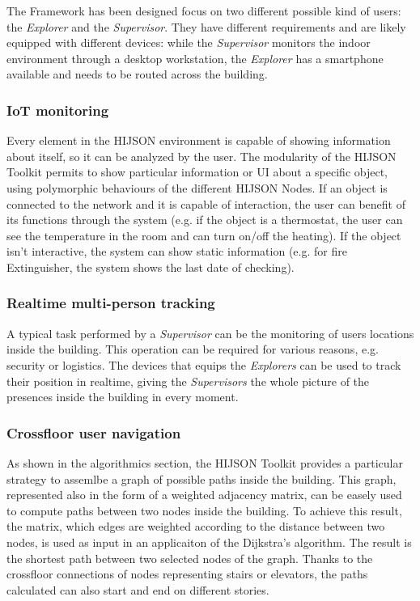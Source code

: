 \documentclass{sig-alternate}
\begin{document}
The Framework has been designed focus on two different possible kind of
users: the \emph{Explorer} and the \emph{Supervisor}. They have
different requirements and are likely equipped with different devices:
while the \emph{Supervisor} monitors the indoor environment through a
desktop workstation, the \emph{Explorer} has a smartphone available and
needs to be routed across the building.

\subsubsection{IoT monitoring}\label{iot-monitoring}

Every element in the HIJSON environment is capable of showing information
about itself, so it can be analyzed by the user. The modularity of the HIJSON
Toolkit permits to show particular information or UI about a specific object,
using polymorphic behaviours of the different HIJSON Nodes. If an object is
connected to the network and it is capable of interaction, the user can
benefit of its functions through the system (e.g. if the object is a
thermostat, the user can see the temperature in the room and can turn on/off
the heating). If the object isn't interactive, the system can show static
information (e.g. for fire Extinguisher, the system shows the last date of
checking).

\subsubsection{Realtime multi-person tracking}\label{realtime-multi-person-tracking}

A typical task performed by a \emph{Supervisor} can be the monitoring of users
locations inside the building. This operation can be required for various
reasons, e.g. security or logistics. The devices that equips the
\emph{Explorers} can be used to track their position in realtime, giving the
\emph{Supervisors} the whole picture of the presences inside the building in
every moment.

\subsubsection{Crossfloor user navigation}\label{crossfloor-user-navigation}

As shown in the algorithmics section, the HIJSON Toolkit provides a particular
strategy to assemlbe a graph of possible paths inside the building. This
graph, represented also in the form of a weighted adjacency matrix, can be
easely used to compute paths between two nodes inside the building. To
achieve this result, the matrix, which edges are weighted according to the
distance between two nodes, is used as input in an applicaiton of the
Dijkstra's algorithm. The result is the shortest path between two selected
nodes of the graph. Thanks to the crossfloor connections of nodes
representing stairs or elevators, the paths calculated can also start and end
on different stories.
\end{document}
